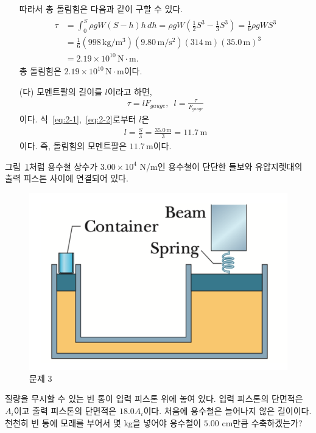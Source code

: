 \documentclass[floatfix,nofootinbib,superscriptaddress,fleqn]{revtex4-2}
\begin{document}
\begin{itemize}
  따라서 총 돌림힘은 다음과 같이 구할 수 있다.
  \begin{align}
    \begin{split}\label{eq:2-2}
      \tau &=\int_0^S \rho g W (S-h)h \,dh 
      = \rho g W\left(\frac{1}{2}S^3-\frac{1}{3}S^3\right)
      =\frac{1}{6}\rho g WS^3 \\
      &=\frac{1}{6}(998\,\mathrm{kg/m^3})
      (9.80\,\mathrm{m/s^2}) 
      (314\,\mathrm{m})(35.0\,\mathrm{m})^3  \\
      &= 2.19\times 10^{10}\,\mathrm{N\cdot m}.
    \end{split}
  \end{align}
  총 돌림힘은 $2.19\times 10^{10}\,\mathrm{N\cdot m}$이다.
  \item[(다)] 모멘트팔의 길이를 $l$이라고 하면,
  \begin{align}
    \tau = lF_{gauge},\,\,\,l = \frac{\tau}{F_{gauge}}
  \end{align}
  이다. 식~\eqref{eq:2-1},~\eqref{eq:2-2}로부터 $l$은
  \begin{align}
    l = \frac{S}{3} = \frac{35.0\,\mathrm{m}}{3}
    =11.7\,\mathrm{m}
  \end{align}
  이다. 즉, 돌림힘의 모멘트팔은 $11.7\,\mathrm{m}$이다.
\end{itemize}

\vspace{1.cm}


그림~\ref{fig:2}처럼 용수철 상수가 $3.00\times 10^4$ N/m인 용수철이
단단한 들보와 유압지렛대의 출력 피스톤 사이에 연결되어 있다.
\begin{figure}[htp]
  \centering
  \includegraphics[scale=0.65]{Qfig16-2.pdf}
    \caption{문제 3}
  \label{fig:2}
\end{figure}
 질량을 무시할 수 있는 빈 통이 입력 피스톤 위에 놓여 있다. 입력 피스톤의
단면적은 $A_i$이고 출력 피스톤의 단면적은 $18.0 A_i$이다. 처음에
용수철은 늘어나지 않은 길이이다. 천천히 빈 통에 모래를 부어서 몇 kg을
넣어야 용수철이 $5.00$ cm만큼 수축하겠는가? 
\end{document}
